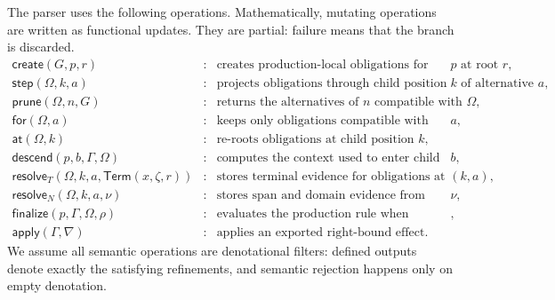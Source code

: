 The parser uses the following operations. Mathematically, mutating operations are written as functional updates. They are partial: failure means that the branch is discarded.
\[
\begin{array}{rcl}
\mathsf{create}(G,p,r)
&:&
\text{creates production-local obligations for production }p\text{ at root }r,
\\[0.25em]

\mathsf{step}(\Omega,k,a)
&:&
\text{projects obligations through child position }k\text{ of alternative }a,
\\[0.25em]

\mathsf{prune}(\Omega,n,G)
&:&
\text{returns the alternatives of }n\text{ compatible with }\Omega,
\\[0.25em]

\mathsf{for}(\Omega,a)
&:&
\text{keeps only obligations compatible with seeded alternative }a,
\\[0.25em]

\mathsf{at}(\Omega,k)
&:&
\text{re-roots obligations at child position }k,
\\[0.25em]

\mathsf{descend}(p,b,\Gamma,\Omega)
&:&
\text{computes the context used to enter child binding }b,
\\[0.25em]

\mathsf{resolve}_T(\Omega,k,a,\mathsf{Term}(x,\zeta,r))
&:&
\text{stores terminal evidence for obligations at }(k,a),
\\[0.25em]

\mathsf{resolve}_N(\Omega,k,a,\nu)
&:&
\text{stores span and domain evidence from accepted child node }\nu,
\\[0.25em]

\mathsf{finalize}(p,\Gamma,\Omega,\rho)
&:&
\text{evaluates the production rule when finishing a node},
\\[0.25em]

\mathsf{apply}(\Gamma,\nabla)
&:&
\text{applies an exported right-bound effect}.
\end{array}
\]
We assume all semantic operations are denotational filters: defined outputs denote exactly the satisfying refinements, and semantic rejection happens only on empty denotation.

